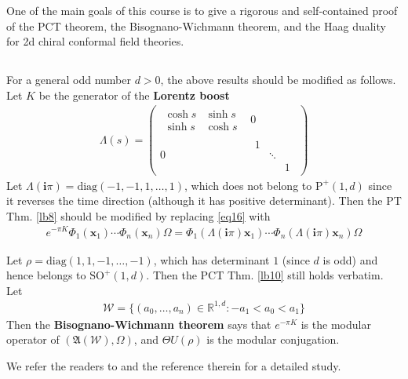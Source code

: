 \documentclass[12pt,b5paper,notitlepage]{article}
\theoremstyle{definition}
\theoremstyle{plain}
\newcommand{\fk}{\mathfrak}
\newcommand{\mc}{\mathcal}
\newcommand{\diag}{\mathrm{diag}}
\newcommand{\im}{\mathbf{i}}
\newcommand{\Rbb}{\mathbb R}
\newcommand{\Poid}{{\mathrm P}^+(1,d)}
\newcommand{\xbf}{\mathbf x}
\newcommand{\SO}{\mathrm{SO}}
\numberwithin{equation}{section}
\begin{document}
One of the main goals of this course is to give a rigorous and self-contained proof of the PCT theorem, the Bisognano-Wichmann theorem, and the Haag duality for 2d chiral conformal field theories.




\subsection{}

For a general odd number $d>0$, the above results should be modified as follows. Let $K$ be the generator of the \textbf{Lorentz boost} 
\begin{align*}
\Lambda(s)=\left(
\begin{array}{c|c}
\begin{matrix}
\cosh s&\sinh s\\
\sinh s&\cosh s
\end{matrix}
&0\\
\hline
0&
\begin{matrix}
1&&\\
&\ddots&\\
&&1
\end{matrix}
\end{array}
\right)
\end{align*}
Let $\Lambda(\im\pi)=\diag(-1,-1,1,\dots,1)$, which does not belong to $\Poid$ since it reverses the time direction (although it has positive determinant). Then the PT Thm. \ref{lb8} should be modified by replacing \eqref{eq16} with 
\begin{align}
e^{-\pi K}\Phi_1(\xbf_1)\cdots\Phi_n(\xbf_n)\Omega=\Phi_1(\Lambda(\im\pi)\xbf_1)\cdots\Phi_n(\Lambda(\im\pi)\xbf_n)\Omega
\end{align} 

Let $\rho=\diag(1,1,-1,\dots,-1)$, which has determinant $1$ (since $d$ is odd) and hence belongs to $\SO^+(1,d)$. Then the PCT Thm. \ref{lb10} still holds verbatim. Let
\begin{align}
\mc W=\{(a_0,\dots,a_n)\in\Rbb^{1,d}:-a_1<a_0<a_1\}
\end{align}
Then the \textbf{Bisognano-Wichmann theorem} says that $e^{-\pi K}$ is the modular operator of $(\fk A(\mc W),\Omega)$, and $\Theta U(\rho)$ is the modular conjugation. 


We refer the readers to \cite[Sec. V.4.1]{Haag} and the reference therein for a detailed study.
 
\end{document}
